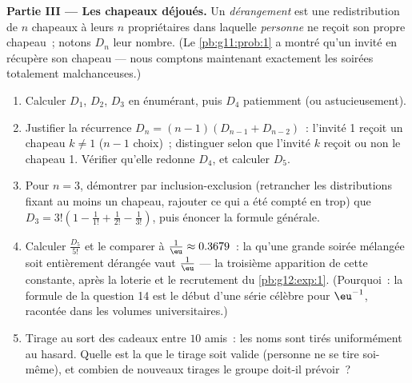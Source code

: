 \begin{problem}
\medskip
\noindent\textbf{Partie III --- Les chapeaux déjoués.}
Un \emph{dérangement} est une redistribution de $n$ chapeaux à leurs
$n$ propriétaires dans laquelle \emph{personne} ne reçoit son propre
chapeau~; notons $D_n$ leur nombre. (Le \cref{pb:g11:prob:1} a
montré qu'un invité en  récupère son chapeau --- nous
comptons maintenant exactement les soirées totalement
malchanceuses.)
\begin{enumerate}[resume]
  \item Calculer $D_1$, $D_2$, $D_3$ en énumérant, puis $D_4$
        patiemment (ou astucieusement).
  \item Justifier la récurrence
        $D_n = (n - 1)\left(D_{n-1} + D_{n-2}\right)$~: l'invité 1
        reçoit un chapeau $k \neq 1$ ($n - 1$ choix)~; distinguer
        selon que l'invité $k$ reçoit ou non le chapeau 1. Vérifier
        qu'elle redonne $D_4$, et calculer $D_5$.
  \item Pour $n = 3$, démontrer par inclusion-exclusion
        (retrancher les distributions fixant au moins un chapeau,
        rajouter ce qui a été compté en trop) que
        $D_3 = 3!\left(1 - \frac{1}{1!} + \frac{1}{2!} -
        \frac{1}{3!}\right)$, puis énoncer la formule générale.
  \item Calculer $\frac{D_5}{5!}$ et le comparer à
        $\frac1\eu \approx 0.3679$~: la  qu'une grande
        soirée mélangée soit entièrement dérangée vaut $\frac1\eu$
        --- la troisième apparition de cette constante, après la
        loterie et le recrutement du \cref{pb:g12:exp:1}. (Pourquoi~:
        la formule de la question 14 est le début d'une série
        célèbre pour $\eu^{-1}$, racontée dans les volumes
        universitaires.)
  \item Tirage au sort des cadeaux entre $10$ amis~: les noms sont
        tirés uniformément au hasard. Quelle est la  que
        le tirage soit valide (personne ne se tire soi-même), et
        combien de nouveaux tirages le groupe doit-il prévoir~?
\end{enumerate}


\end{problem}
